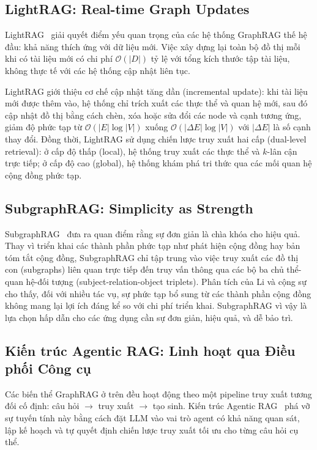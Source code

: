 \documentclass[12pt,a4paper]{report}
\theoremstyle{plain}
\theoremstyle{definition}
\begin{document}
	\subsection{LightRAG: Real-time Graph Updates}
	\label{subsec:lightrag}

	LightRAG~\cite{guo2024lightrag} giải quyết điểm yếu quan trọng của các hệ
	thống GraphRAG thế hệ đầu: khả năng thích ứng với dữ liệu mới. Việc xây dựng
	lại toàn bộ đồ thị mỗi khi có tài liệu mới có chi phí $\mathcal{O}(|D|)$ tỷ
	lệ với tổng kích thước tập tài liệu, không thực tế với các hệ thống cập nhật
	liên tục.
	
	LightRAG giới thiệu cơ chế cập nhật tăng dần (incremental update): khi tài
	liệu mới được thêm vào, hệ thống chỉ trích xuất các thực thể và quan hệ mới,
	sau đó cập nhật đồ thị bằng cách chèn, xóa hoặc sửa đổi các node và cạnh
	tương ứng, giảm độ phức tạp từ $\mathcal{O}(|E|\log|V|)$ xuống
	$\mathcal{O}(|\Delta E|\log|V|)$ với $|\Delta E|$ là số cạnh thay đổi. Đồng
	thời, LightRAG sử dụng chiến lược truy xuất hai cấp (dual-level retrieval):
	ở cấp độ thấp (local), hệ thống truy xuất các thực thể và $k$-lân cận trực
	tiếp; ở cấp độ cao (global), hệ thống khám phá tri thức qua các mối quan hệ
	cộng đồng phức tạp.
	
	\subsection{SubgraphRAG: Simplicity as Strength}
	\label{subsec:subgraphrag}
	
	SubgraphRAG~\cite{subgraphrag2025} đưa ra quan điểm rằng sự đơn giản là chìa
	khóa cho hiệu quả. Thay vì triển khai các thành phần phức tạp như phát hiện
	cộng đồng hay bản tóm tắt cộng đồng, SubgraphRAG chỉ tập trung vào việc truy
	xuất các đồ thị con (subgraphs) liên quan trực tiếp đến truy vấn thông qua các
	bộ ba chủ thể-quan hệ-đối tượng (subject-relation-object triplets). Phân tích
	của Li và cộng sự cho thấy, đối với nhiều tác vụ, sự phức tạp bổ sung từ các
	thành phần cộng đồng không mang lại lợi ích đáng kể so với chi phí triển khai.
	SubgraphRAG vì vậy là lựa chọn hấp dẫn cho các ứng dụng cần sự đơn giản, hiệu
	quả, và dễ bảo trì.
	
	\subsection{Kiến trúc Agentic RAG: Linh hoạt qua Điều phối Công cụ}
	\label{subsec:agentic_rag}
	
	Các biến thể GraphRAG ở trên đều hoạt động theo một pipeline truy xuất tương
	đối cố định: câu hỏi $\to$ truy xuất $\to$ tạo sinh. Kiến trúc Agentic
	RAG~\cite{neo4j2024essential} phá vỡ sự tuyến tính này bằng cách đặt LLM vào
	vai trò agent có khả năng quan sát, lập kế hoạch và tự quyết định chiến lược
	truy xuất tối ưu cho từng câu hỏi cụ thể.
	
\end{document}
